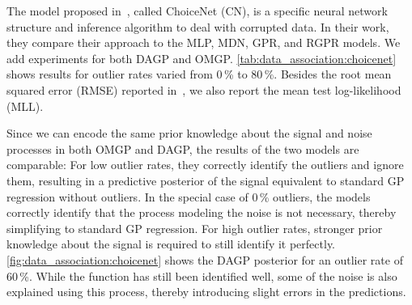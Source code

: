 The model proposed in~\parencite{choi_choicenet_2018}, called ChoiceNet (CN), is a specific neural network structure and inference algorithm to deal with corrupted data.
In their work, they compare their approach to the MLP, MDN, GPR, and RGPR models.
We add experiments for both DAGP and OMGP.
\cref{tab:data_association:choicenet} shows results for outlier rates varied from 0\,\% to 80\,\%.
Besides the root mean squared error (RMSE) reported in~\parencite{choi_choicenet_2018}, we also report the mean test log-likelihood (MLL).

Since we can encode the same prior knowledge about the signal and noise processes in both OMGP and DAGP, the results of the two models are comparable:
For low outlier rates, they correctly identify the outliers and ignore them, resulting in a predictive posterior of the signal equivalent to standard GP regression without outliers.
In the special case of 0\,\% outliers, the models correctly identify that the process modeling the noise is not necessary, thereby simplifying to standard GP regression.
For high outlier rates, stronger prior knowledge about the signal is required to still identify it perfectly.
\cref{fig:data_association:choicenet} shows the DAGP posterior for an outlier rate of 60\,\%.
While the function has still been identified well, some of the noise is also explained using this process, thereby introducing slight errors in the predictions.


